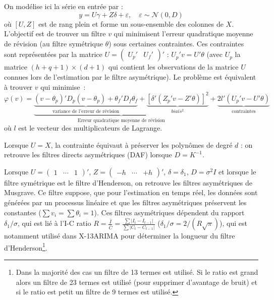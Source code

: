 \documentclass[
  12pt,
  a4paper,french]{article}
\newcommand\1{\mathds{1}}
\begin{document}
On modélise ici la série en entrée par :
\begin{equation}
y=U\gamma+Z\delta+\varepsilon,\quad
\varepsilon\sim\mathcal{N}(0,D)
\label{eq:lpgeneralmodel}
\end{equation}
où \([U,Z]\) est de rang plein et forme un sous-ensemble des colonnes de \(X\).
L'objectif est de trouver un filtre \(v\) qui minimisent l'erreur quadratique moyenne de révision (au filtre symétrique \(\theta\)) sous certaines contraintes.
Ces contraintes sont représentées par la matrice \(U=\begin{pmatrix}U_{p}'&U_{f}'\end{pmatrix}'\) : \(U_p'v=U'\theta\) (avec \(U_p\) la matrice \((h+q+1)\times (d+1)\) qui contient les observations de la matrice \(U\) connues lors de l'estimation par le filtre asymétrique).
Le problème est équivalent à trouver \(v\) qui minimise~:
\begin{equation}
\varphi(v)=
\underbrace{
  \underbrace{(v-\theta_{p})'D_{p}(v-\theta_{p})+
  \theta_{f}'D_{f}\theta_{f}}_\text{variance de l'erreur de révision}+
  \underbrace{[\delta'(Z_{p}'v-Z'\theta)]^{2}}_{biais^2}
}_\text{Erreur quadratique moyenne de révision}+
\underbrace{2l'(U_{p}'v-U'\theta)}_{\text{contraintes}}
\label{eq:lppasym}
\end{equation}
où \(l\) est le vecteur des multiplicateurs de Lagrange.

Lorsque \(U=X\), la contrainte équivaut à préserver les polynômes de degré \(d\) : on retrouve les filtres directs asymétriques (DAF) lorsque \(D=K^{-1}\).

Lorsque \(U=\begin{pmatrix}1&\cdots&1\end{pmatrix}'\), \(Z=\begin{pmatrix}-h&\cdots&+h\end{pmatrix}'\), \(\delta=\delta_1\), \(D=\sigma^2I\) et lorsque le filtre symétrique est le filtre d'Henderson, on retrouve les filtres asymétriques de Musgrave.
Ce filtre suppose, que pour l'estimation en temps réel, les données sont générées par un processus linéaire et que les filtres asymétriques préservent les constantes (\(\sum v_i=\sum \theta_i=1\)).
Ces filtres asymétriques dépendent du rapport \(\delta_1/\sigma\), qui est lié à l'I-C ratio \(R=\frac{\bar{I}}{\bar{C}}=\frac{\sum\lvert I_t-I_{t-1}\rvert}{\sum\lvert C_t-C_{t-1}\rvert}\) (\(\delta_1/\sigma=2/(R\sqrt{\pi})\)), qui est notamment utilisé dans X-13ARIMA pour déterminer la longueur du filtre d'Henderson\footnote{
  Dans la majorité des cas un filtre de 13 termes est utilisé.
  Si le ratio est grand alors un filtre de 23 termes est utilisé (pour supprimer d'avantage de bruit) et si le ratio est petit un filtre de 9 termes est utilisé.}.
\end{document}
